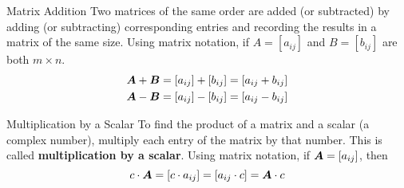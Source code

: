 \documentclass{beamer}
\begin{document}
\begin{frame}
\begin{block}{Matrix Addition}
Two matrices of the same order are added (or subtracted) by adding (or subtracting) corresponding entries and recording the results in a matrix of the same size. Using matrix notation, if $A=[a_{ij}]$ and $B=[b_{ij}]$ are both $m\times n$.
\begin{equation*}
\begin{split}
\boldsymbol{A}+\boldsymbol{B}&=[a_{ij}]+[b_{ij}]=[a_{ij}+b_{ij}]\\
\boldsymbol{A}-\boldsymbol{B}&=[a_{ij}]-[b_{ij}]=[a_{ij}-b_{ij}]
\end{split}
\end{equation*}
\end{block}\pause
\begin{block}{Multiplication by a Scalar}
To find the product of a matrix and a scalar (a complex number), multiply each entry of the matrix by that number. This is called \textbf{multiplication by a scalar}. Using matrix notation, if $\boldsymbol{A}=[a_{ij}]$, then
\[c\cdot \boldsymbol{A}=[c\cdot a_{ij}] = [a_{ij}\cdot c] = \boldsymbol{A}\cdot c\]
\end{block}
\end{frame}
\end{document}
